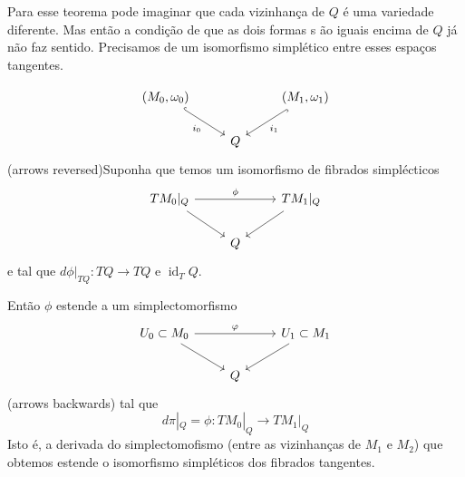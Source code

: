 Para esse teorema pode imaginar que cada vizinhança de $Q$ \'e uma variedade diferente. Mas ent\~ao a condi\c c\~ao de que as dois formas s \~ao iguais encima de $Q$ j\'a n\~ao faz sentido. Precisamos de um isomorfismo simpl\'etico entre esses espaços tangentes.

\begin{thm}\leavevmode
	\[\begin{tikzcd}
		(M_0,\omega_0)\arrow[dr,"i_0",swap,hook]&&(M_1,\omega_1)\arrow[dl,"i_1",hook]\\
	&Q
	\end{tikzcd}\]
	(arrows reversed)Suponha que temos um isomorfismo de fibrados simpl\'ecticos
	\[\begin{tikzcd}
	TM_0|_{Q}\arrow[rr,"\phi"]\arrow[dr,swap]&&TM_1|_{Q}\arrow[dl]\\
	&Q
	\end{tikzcd}\]
	e tal que $d\phi|_{TQ}:TQ\to TQ$ e $\operatorname{id}_TQ$.

	Ent\~ao $\phi$ estende a um simplectomorfismo
	\[\begin{tikzcd}
	U_0\subset M_0\arrow[rr,"\varphi"]\arrow[dr,swap]&&U_1\subset M_1\arrow[dl]\\
	&Q
	\end{tikzcd}\]
	(arrows backwards) tal que
	\[d\pi|_{Q}=\phi:TM_0|_{Q}\to TM_1|_{Q}\]
	Isto \'e, a derivada do simplectomofismo (entre as vizinhanças de $M_1$ e $M_2$) que obtemos estende o isomorfismo simpl\'eticos dos fibrados tangentes.
\end{thm}

